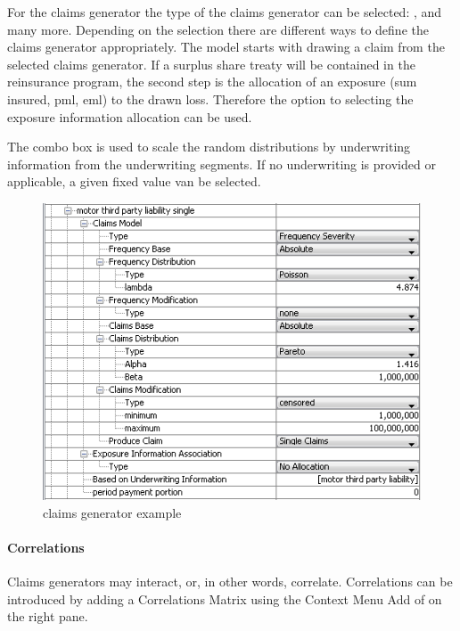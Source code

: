 For the claims generator the type of the claims generator can be selected:
,  and many more.
Depending on the selection there are different ways to define the claims generator appropriately.
The model starts with drawing a claim from the selected claims generator. If a surplus
share treaty will be contained in the reinsurance program, the second step is the allocation of an exposure (sum insured,
pml, eml) to the drawn loss. Therefore the option to selecting the exposure information
allocation can be used.

The combo box  is used to scale the random distributions by
underwriting information from the underwriting segments. If no underwriting is provided or applicable, a given fixed value  van be selected.
\begin{figure}
	\centering
		\includegraphics[scale=0.75]{images/podra-claimsgen.png}
	\caption{\PODRA{} claims generator example}
	\label{fig:podra-claimsgen}
\end{figure}

\paragraph{Correlations}
Claims generators may interact, or, in other words, correlate. Correlations can be introduced by adding a
Correlations Matrix using the Context Menu Add of  on the right pane.

